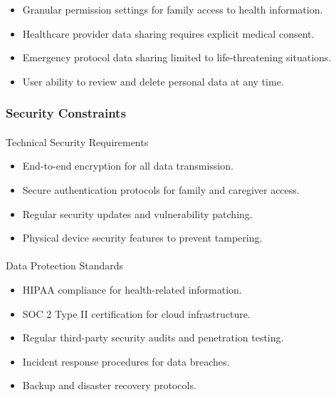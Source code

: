 \documentclass[
  letterpaper,
  DIV=11,
  numbers=noendperiod]{scrartcl}
\makeatletter
\let\oldparagraph\paragraph
\renewcommand{\paragraph}{
    \@ifstar
      \xxxParagraphStar
      \xxxParagraphNoStar
  }
\newcommand{\xxxParagraphStar}[1]{\oldparagraph*{#1}\mbox{}}
\newcommand{\xxxParagraphNoStar}[1]{\oldparagraph{#1}\mbox{}}
\providecommand{\tightlist}{%
  \setlength{\itemsep}{0pt}\setlength{\parskip}{0pt}}\usepackage{longtable,booktabs,array}
\makeatother
\begin{document}
\begin{itemize}
\tightlist
\item
  Granular permission settings for family access to health information.
\item
  Healthcare provider data sharing requires explicit medical consent.
\item
  Emergency protocol data sharing limited to life-threatening
  situations.
\item
  User ability to review and delete personal data at any time.
\end{itemize}

\subsubsection{Security Constraints}\label{security-constraints}

\paragraph{Technical Security
Requirements}\label{technical-security-requirements}

\begin{itemize}
\tightlist
\item
  End-to-end encryption for all data transmission.
\item
  Secure authentication protocols for family and caregiver access.
\item
  Regular security updates and vulnerability patching.
\item
  Physical device security features to prevent tampering.
\end{itemize}

\paragraph{Data Protection Standards}\label{data-protection-standards}

\begin{itemize}
\tightlist
\item
  HIPAA compliance for health-related information.
\item
  SOC 2 Type II certification for cloud infrastructure.
\item
  Regular third-party security audits and penetration testing.
\item
  Incident response procedures for data breaches.
\item
  Backup and disaster recovery protocols.
\end{itemize}
\end{document}

